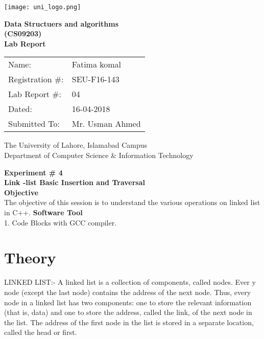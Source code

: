 \documentclass[11pt]{article}            %
\begin{document}
\begin{titlepage}
    \centering
  \vfill
    \texttt{[image: uni\_logo.png]} \\ 
	\vskip2cm
    {\bfseries\Large
	Data Structuers and algorithms \\ (CS09203)\\
	
	\vskip2cm
	Lab Report 
	 
	\vskip2cm
	}    

\begin{center}
\begin{tabular}{ l l  } 

Name: & Fatima komal \\ 
Registration \#: & SEU-F16-143 \\ 
Lab Report \#: & 04 \\ 
 Dated:& 16-04-2018\\ 
Submitted To:& Mr. Usman Ahmed\\ 

\end{tabular}
\end{center}
    \vfill
    The University of Lahore, Islamabad Campus\\
Department of Computer Science \& Information Technology
\end{titlepage}


    
    {\bfseries\Large
\centering
	Experiment \# 4 \\

Link -list Basic Insertion and Traversal \\
	
	}    
 \vskip1cm
 \textbf {Objective}\\ The objective of this session is to understand the various operations on linked list in C++.
 \textbf {Software Tool} \\
 1. Code Blocks with GCC compiler.

\section{Theory }              

LINKED LIST:- 
A linked  list  is a collection of components,  called nodes.  Ever y  node (except the  last  node) 
contains the address of the next node. Thus, every node in a  linked list  has two  components: 
one to store the relevant information (that is, data) and one to store the address, called the link, 
of the next node in the list. The address of the first node in the list is stored in a separate location, 
called the head or first.
\end{document}
